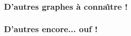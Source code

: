 \documentclass[8pt]{article} %
\begin{document}

\begin{frame}[plain]
\frametitle{\bf D'autres graphes \`a conna\^{\i}tre !} 
\medskip 

\grapheXVA \quad \grapheXXXVA \quad \grapheXinvVA \quad %

\grapheSIN \quad \grapheCOS \quad \grapheTAN %

\grapheASIN \quad \grapheACOS \quad \grapheATAN %

\end{frame}


\begin{frame}
\frametitle{\bf D'autres encore... ouf !} 
\medskip 

\qquad \qquad \grapheEXP \qquad \grapheEXPinv 

\qquad \qquad \grapheLN \qquad \grapheLNinv

\grapheSINH \qquad \grapheCOSH \qquad \grapheTANH

\end{frame}


\raisebox{-.7\height}{\croissant}  

\raisebox{-.7\height}{\decroissant}  

\raisebox{-.7\height}{\constant}  

\end{document}
